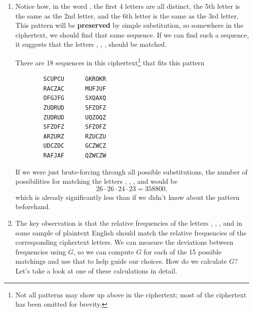 \documentclass[letterpaper]{article}
\begin{document}
\begin{enumerate}
    \item Notice how, in the word , the first 4 letters are all distinct, the 5th letter is the same as the 2nd letter, and the 6th letter is the same as the 3rd letter. This pattern will be \textbf{preserved} by simple substitution, so somewhere in the ciphertext, we should find that same sequence. If we can find such a sequence, it suggests that the letters , , ,  should be matched.  
    
    \bigskip

    There are 18 sequences in this ciphertext\footnote{Not all patterns may show up above in the ciphertext; most of the ciphertext has been omitted for brevity.} that fits this pattern
    \begin{verbatim}
        SCUPCU      GKROKR
        RACZAC      MUFJUF
        OFGJFG      SXQAXQ
        ZUDRUD      SFZOFZ
        ZUDRUD      UQZOQZ
        SFZOFZ      SFZOFZ
        ARZURZ      RZUCZU
        UDCZDC      GCZWCZ
        RAFJAF      QZWCZW\end{verbatim}

    If we were just brute-forcing through all possible substitutions, the number of possibilities for matching the letters , , , and  would be 
    \[26 \cdot 26 \cdot 24 \cdot 23 = 358800,\]
    which is already significantly less than if we didn't know about the pattern beforehand. 

    \item The key observation is that the relative frequencies of the letters , , , and  in some sample of plaintext English should match the relative frequencies of the corresponding ciphertext letters. We can measure the deviations between frequencies using $G$, so we can compute $G$ for each of the 15 possible matchings and use that to help guide our choices. How do we calculate $G$? Let's take a look at one of these calculations in detail. 
    

\end{enumerate}
\end{document}
